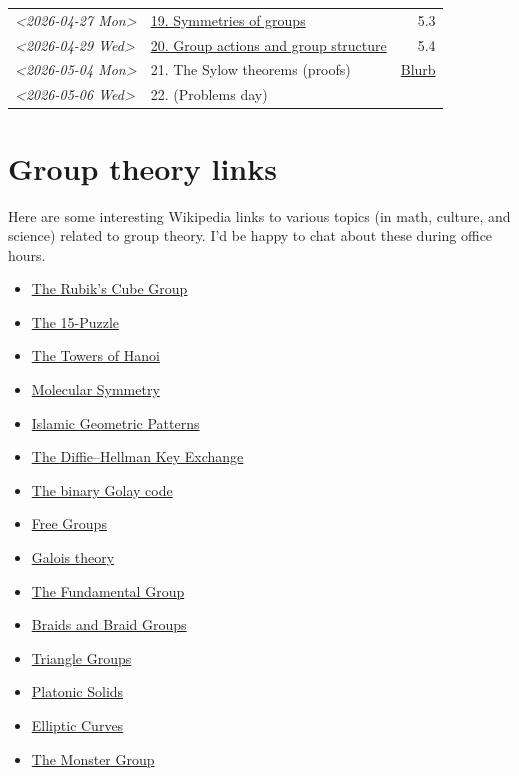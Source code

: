 \documentclass[11pt]{article}
\begin{document}
\begin{center}
\begin{tabular}{l|l|r}
\textit{<2026-04-27 Mon>} & \href{https://www.dropbox.com/scl/fi/b1lgkyzgax41va73m8dcy/Lecture-20.pdf?rlkey=2wntwn600iv1rs23altpxdm88\&dl=0}{19. Symmetries of groups} & 5.3\\[0pt]
\textit{<2026-04-29 Wed>} & \href{https://www.dropbox.com/scl/fi/t8plgi2v2iy9i1xb38pco/Lecture-21.pdf?rlkey=swne53r5vpy94gxow1zqolqy8\&dl=0}{20. Group actions and group structure} & 5.4\\[0pt]
\textit{<2026-05-04 Mon>} & 21. The Sylow theorems (proofs) & \href{https://kconrad.math.uconn.edu/blurbs/grouptheory/sylowpf.pdf}{Blurb}\\[0pt]
\textit{<2026-05-06 Wed>} & 22. (Problems day) & \\[0pt]
\hline
\end{tabular}
\end{center}

\section*{Group theory links}
\label{sec:org7bb381f}
Here are some interesting Wikipedia links to various topics (in math, culture,
and science) related to group theory. I'd be happy to chat about these during
office hours.
\begin{itemize}
\item \href{https://en.wikipedia.org/wiki/Rubik\%27s\_Cube\_group}{The Rubik’s Cube Group}
\item \href{https://en.wikipedia.org/wiki/15\_puzzle}{The 15-Puzzle}
\item \href{https://en.wikipedia.org/wiki/Tower\_of\_Hanoi}{The Towers of Hanoi}
\item \href{https://en.wikipedia.org/wiki/Molecular\_symmetry}{Molecular Symmetry}
\item \href{https://en.wikipedia.org/wiki/Islamic\_geometric\_patterns}{Islamic Geometric Patterns}
\item \href{https://en.wikipedia.org/wiki/Diffie\%E2\%80\%93Hellman\_key\_exchange}{The Diffie--Hellman Key Exchange}
\item \href{https://en.wikipedia.org/wiki/Binary\_Golay\_code}{The binary Golay code}
\item \href{https://en.wikipedia.org/wiki/Free\_group}{Free Groups}
\item \href{https://en.wikipedia.org/wiki/Galois\_theory}{Galois theory}
\item \href{https://en.wikipedia.org/wiki/Fundamental\_group}{The Fundamental Group}
\item \href{https://en.wikipedia.org/wiki/Braid\_group}{Braids and Braid Groups}
\item \href{https://en.wikipedia.org/wiki/Triangle\_group}{Triangle Groups}
\item \href{https://en.wikipedia.org/wiki/Platonic\_solid}{Platonic Solids}
\item \href{https://en.wikipedia.org/wiki/Elliptic\_curve\#The\_group\_law}{Elliptic Curves}
\item \href{https://en.wikipedia.org/wiki/Monster\_group}{The Monster Group}
\end{itemize}
\end{document}
